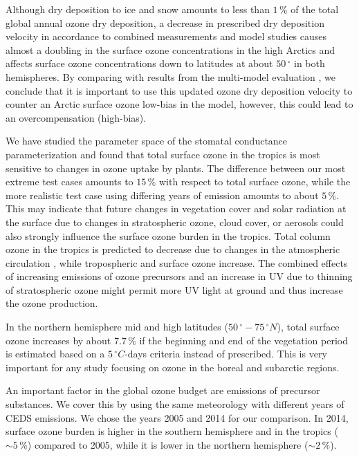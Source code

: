 \documentclass[gmd, manuscript]{copernicus}
\begin{document}
Although dry deposition to ice and snow amounts to less than $1\,\unit{\%}$ of the total global annual ozone dry deposition, a decrease in prescribed dry deposition velocity in accordance to combined measurements and model studies \citep{ACP:Helmig2007} causes almost a doubling in the surface ozone concentrations in the high Arctics and affects surface ozone concentrations down to latitudes at about $50\,\unit{^\circ}$ in both hemispheres. By comparing with results from the multi-model evaluation \citep{ACP:Hardacre2015}, we conclude that it is important to use this updated ozone dry deposition velocity to counter an Arctic surface ozone low-bias in the model, however, this could lead to an overcompensation (high-bias).

We have studied the parameter space of the stomatal conductance parameterization and found that total surface ozone in the tropics is most sensitive to changes in ozone uptake by plants. The difference between our most extreme test cases amounts to $15\,\unit{\%}$ with respect to total surface ozone, while the more realistic test case using differing years of emission amounts to about $5\,\unit{\%}$. This may indicate that future changes in vegetation cover and solar radiation at the surface due to changes in stratospheric ozone, cloud cover, or aerosols could also strongly influence the surface ozone burden in the tropics. Total column ozone in the tropics is predicted to decrease due to changes in the atmospheric circulation \citep[e.g.,][]{WMO2014}, while tropospheric and surface ozone increase. The combined effects of increasing emissions of ozone precursors and an increase in UV due to thinning of stratospheric ozone might permit more UV light at ground and thus increase the ozone production.

In the northern hemisphere mid and high latitudes ($50\,\unit{^\circ}-75\,\unit{^\circ N}$), total surface ozone increases by about $7.7\,\unit{\%}$ if the beginning and end of the vegetation period is estimated based on a $5\,\unit{^\circ C}$-days criteria instead of prescribed. This is very important for any study focusing on ozone in the boreal and subarctic regions.

An important factor in the global ozone budget are emissions of precursor substances. We cover this by using the same meteorology with different years of CEDS emissions. We chose the years 2005 and 2014 for our comparison. In 2014, surface ozone burden is higher in the southern hemisphere and in the tropics ($\sim 5\,\unit{\%}$) compared to 2005, while it is lower in the northern hemisphere ($\sim 2\,\unit{\%}$).
\end{document}
